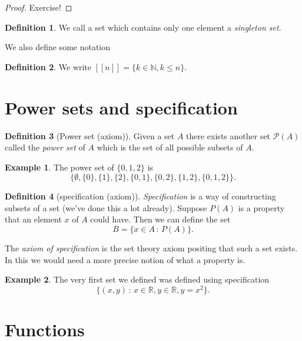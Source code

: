 \documentclass[
]{book}
\theoremstyle{definition}
\newtheorem{definition}{Definition}[chapter]
\theoremstyle{definition}
\newtheorem{example}{Example}[chapter]
\theoremstyle{definition}
\theoremstyle{definition}
\theoremstyle{remark}
\begin{document}
\begin{proof}
Exercise!
\end{proof}

\begin{definition}
We call a set which contains only one element a \emph{singleton set}.
\end{definition}

We also define some notation

\begin{definition}
We write \([[n]]= \{ k\in \mathbb{N}, k \leq n\}\).
\end{definition}

\section{Power sets and specification}\label{power-sets-and-specification}

\begin{definition}[Power set (axiom)]
Given a set \(A\) there exists another set \(\mathcal{P}(A)\) called the \emph{power set} of \(A\) which is the set of all possible subsets of \(A\).
\end{definition}

\begin{example}
The power set of \(\{0,1,2\}\) is
\[ \{ \emptyset, \{0\}, \{1\}, \{2\}, \{0,1\}, \{0,2\}, \{1,2\}, \{0,1,2\}\}.  \]
\end{example}

\begin{definition}[specification (axiom)]
\emph{Specification} is a way of constructing subsets of a set (we've done this a lot already). Suppose \(P(A)\) is a property that an element \(x\) of \(A\) could have. Then we can define the set
\[ B = \{ x \in A \,:\, P(A)\}.  \]
\end{definition}

The \emph{axiom of specification} is the set theory axiom positing that such a set exists. In this we would need a more precise notion of what a property is.

\begin{example}
The very first set we defined was defined using specification
\[ \{(x, y)\,:\, x \in \mathbb{R}, y \in \mathbb{R}, y=x^2\}.  \]
\end{example}

\section{Functions}\label{functions}
\end{document}
